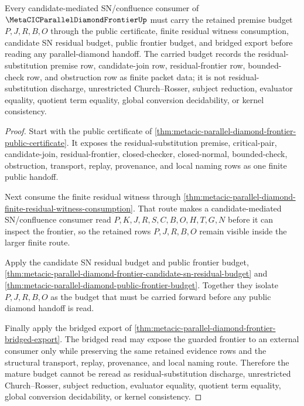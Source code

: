 \begin{theorem}
\label{thm:metacic-parallel-diamond-frontier-retained-premise-mature-budget}
Every candidate-mediated SN/confluence consumer of $\MetaCICParallelDiamondFrontierUp$ must carry the retained premise budget $P,J,R,B,O$ through the public certificate, finite residual witness consumption, candidate SN residual budget, public frontier budget, and bridged export before reading any parallel-diamond handoff. The carried budget records the residual-substitution premise row, candidate-join row, residual-frontier row, bounded-check row, and obstruction row as finite packet data; it is not residual-substitution discharge, unrestricted Church--Rosser, subject reduction, evaluator equality, quotient term equality, global conversion decidability, or kernel consistency.
\end{theorem}
\begin{proof}
Start with the public certificate of \autoref{thm:metacic-parallel-diamond-frontier-public-certificate}. It exposes the residual-substitution premise, critical-pair, candidate-join, residual-frontier, closed-checker, closed-normal, bounded-check, obstruction, transport, replay, provenance, and local naming rows as one finite public handoff.

Next consume the finite residual witness through \autoref{thm:metacic-parallel-diamond-finite-residual-witness-consumption}. That route makes a candidate-mediated SN/confluence consumer read $P,K,J,R,S,C,B,O,H,T,G,N$ before it can inspect the frontier, so the retained rows $P,J,R,B,O$ remain visible inside the larger finite route.

Apply the candidate SN residual budget and public frontier budget, \autoref{thm:metacic-parallel-diamond-frontier-candidate-sn-residual-budget} and \autoref{thm:metacic-parallel-diamond-public-frontier-budget}. Together they isolate $P,J,R,B,O$ as the budget that must be carried forward before any public diamond handoff is read.

Finally apply the bridged export of \autoref{thm:metacic-parallel-diamond-frontier-bridged-export}. The bridged read may expose the guarded frontier to an external consumer only while preserving the same retained evidence rows and the structural transport, replay, provenance, and local naming route. Therefore the mature budget cannot be reread as residual-substitution discharge, unrestricted Church--Rosser, subject reduction, evaluator equality, quotient term equality, global conversion decidability, or kernel consistency.
\end{proof}
